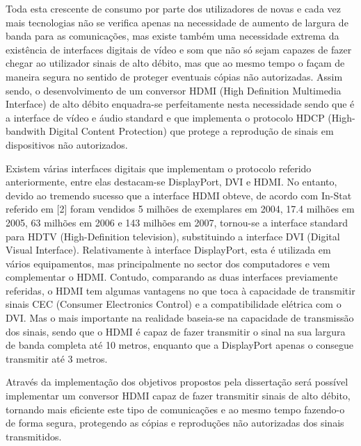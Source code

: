 Toda esta crescente de consumo por parte dos utilizadores de novas e cada vez mais tecnologias não se verifica apenas na necessidade de aumento de largura de banda para as comunicações, mas existe também uma necessidade extrema da existência de interfaces digitais de vídeo e som que não só sejam capazes de fazer chegar ao utilizador sinais de alto débito, mas que ao mesmo tempo o façam de maneira segura no sentido de proteger eventuais cópias não autorizadas. Assim sendo, o desenvolvimento de um conversor HDMI (High Definition Multimedia Interface) de alto débito enquadra-se perfeitamente nesta necessidade sendo que é a interface de vídeo e áudio standard e que implementa o protocolo HDCP (High-bandwith Digital Content Protection) que protege a reprodução de sinais em dispositivos não autorizados.

Existem várias interfaces digitais que implementam o protocolo referido anteriormente, entre elas destacam-se DisplayPort, DVI e HDMI. No entanto, devido ao tremendo sucesso que a interface HDMI obteve, de acordo com In-Stat referido em [2] foram vendidos 5 milhões de exemplares em 2004, 17.4 milhões em 2005, 63 milhões em 2006 e 143 milhões em 2007, tornou-se a interface standard para HDTV (High-Definition television), substituindo a interface DVI (Digital Visual Interface). Relativamente à interface DisplayPort, esta é utilizada em vários equipamentos, mas principalmente no sector dos computadores e vem complementar o HDMI. Contudo, comparando as duas interfaces previamente referidas, o HDMI tem algumas vantagens no que toca à capacidade de transmitir sinais CEC (Consumer Electronics Control) e a compatibilidade elétrica com o DVI. Mas o mais importante na realidade baseia-se na capacidade de transmissão dos sinais, sendo que o HDMI é capaz de fazer transmitir o sinal na sua largura de banda completa até 10 metros, enquanto que a DisplayPort apenas o consegue transmitir até 3 metros.

Através da implementação dos objetivos propostos pela dissertação será possível implementar um conversor HDMI capaz de fazer transmitir sinais de alto débito, tornando mais eficiente este tipo de comunicações e ao mesmo tempo fazendo-o de forma segura, protegendo as cópias e reproduções não autorizadas dos sinais transmitidos.
 

